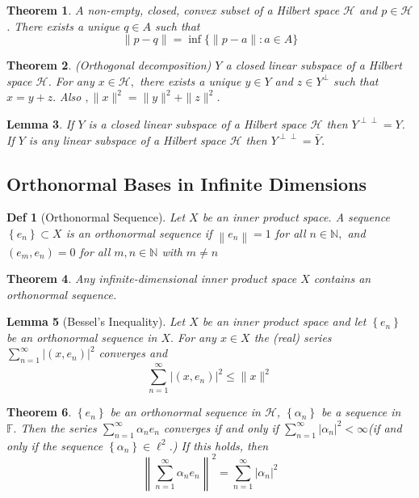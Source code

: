 \documentclass[10pt]{paper}
\newtheorem{theorem}{Theorem}[section]
\newtheorem{definition}{Def}[section]
\newtheorem{lemma}[theorem]{Lemma}
\begin{document}
\begin{theorem}
    $A$ non-empty, closed, convex subset of a Hilbert space $\mathcal{H}$ and $p \in \mathcal{H}$. There exists a unique $q \in A$ such that
    $$
        \|p-q\|=\inf \{\|p-a\|: a \in A\}
    $$
\end{theorem}

\begin{theorem}(Orthogonal decomposition)
    $Y$ a closed linear subspace of a Hilbert space $\mathcal{H}$. For any $x \in \mathcal{H},$ there exists a unique $y \in Y$ and $z \in Y^{\perp}$ such that $x=y+z .$ Also $,\|x\|^{2}=\|y\|^{2}+\|z\|^{2}$.
\end{theorem}

\begin{lemma}
    If $Y$ is a closed linear subspace of a Hilbert space $\mathcal{H}$ then $Y^{\perp \perp}=Y$. If $Y$ is any linear subspace of a Hilbert space $\mathcal{H}$ then $Y^{\perp \perp}=\bar{Y}$.
\end{lemma}

\subsection{Orthonormal Bases in Infinite Dimensions}

\begin{definition}[Orthonormal Sequence]
    Let $X$ be an inner product space. A sequence $\left\{e_{n}\right\} \subset X$ is  an orthonormal sequence if $\left\|e_{n}\right\|=1$ for all $n \in \mathbb{N},$ and $\left(e_{m}, e_{n}\right)=0$ for all $m, n \in \mathbb{N}$ with $m \neq n$
\end{definition}

\begin{theorem}
    Any infinite-dimensional inner product space $X$ contains an orthonormal sequence.
\end{theorem}

\begin{lemma}[Bessel’s Inequality]
    Let $X$ be an inner product space and let $\left\{e_{n}\right\}$ be an orthonormal sequence in $X .$ For any $x \in X$ the (real) series $\sum_{n=1}^{\infty}\left|\left(x, e_{n}\right)\right|^{2}$ converges and
    $$\sum_{n=1}^{\infty}\left|\left(x, e_{n}\right)\right|^{2} \leq\|x\|^{2}$$
\end{lemma}

\begin{theorem}
    $\left\{e_{n}\right\}$ be an orthonormal sequence in $\mathcal{H}$, $\left\{\alpha_{n}\right\}$ be a sequence in $\mathbb{F} .$ Then the series $\sum_{n=1}^{\infty} \alpha_{n} e_{n}$ converges if and only if $\sum_{n=1}^{\infty}\left|\alpha_{n}\right|^{2}<\infty$(if and only if the sequence $\left\{\alpha_{n}\right\} \in \ell^{2}$.) If this holds, then
    $$
        \left\|\sum_{n=1}^{\infty} \alpha_{n} e_{n}\right\|^{2}=\sum_{n=1}^{\infty}\left|\alpha_{n}\right|^{2}
    $$
\end{theorem}
\end{document}
